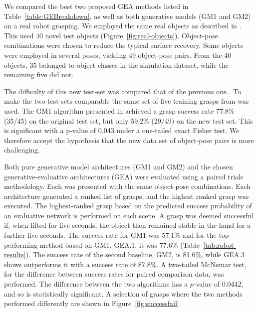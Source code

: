We compared the best two proposed GEA methods listed in Table~\ref{table:GEBreakdown}, as well as both generative models (GM1 and GM2) on a real robot grasping. We employed the same real objects as described in \cite{kopicki2019ijrr}. This used 40 novel test objects (Figure~\ref{fig:real-objects}). Object-pose combinations were chosen to reduce the typical surface recovery. Some objects were employed in several poses, yielding 49 object-pose pairs. From the 40 objects, 35 belonged to object classes in the simulation dataset, while the remaining five did not. 

The difficulty of this new test-set was compared that of the previous one \cite{kopicki2015ijrr}. To make the two test-sets comparable the same set of five training grasps from \cite{kopicki2015ijrr} was used. The GM1 algorithm presented in \cite{kopicki2015ijrr} achieved a grasp success rate 77.8\% (35/45) on the original test set, but only 59.2\% (29/49) on the new test set. This is significant with a p-value of 0.043 under a one-tailed exact Fisher test. We therefore accept the hypothesis that the new data set of object-pose pairs is more challenging.

Both pure generative model architectures (GM1 and GM2) and the chosen generative-evaluative architectures (GEA) were evaluated using a paired trials methodology. Each was presented with the same object-pose combinations. Each architecture generated a ranked list of grasps, and the highest ranked grasp was executed. The highest-ranked grasp based on the predicted success probability of an evaluative network is performed on each scene. A grasp was deemed successful if, when lifted for five seconds, the object then remained stable in the hand for a further five seconds. The success rate for GM1 was 57.1\% and for the top-performing method based on GM1, GEA.1, it was 77.6\% (Table~\ref{tab:robot-results}). The success rate of the second baseline, GM2, is 81.6\%, while GEA.3 shows outperforms it with a success rate of 87.8\%. A two-tailed McNemar test, for the difference between success rates for paired comparison data, was performed. The difference between the two algorithms has a $p$-value of 0.0442, and so is statistically significant. A selection of grasps where the two methods performed differently are shown in Figure~\ref{fig:successfail}.


